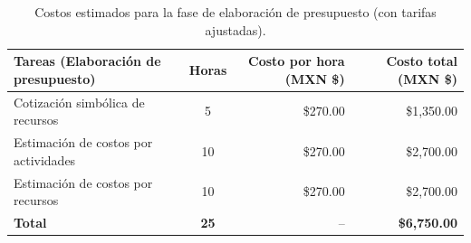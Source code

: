 \begin{table}[H]
	\centering
	\renewcommand{\arraystretch}{1.6}
	\setlength{\tabcolsep}{10pt}
	\Huge
	\begin{adjustbox}{max width=\textwidth}
		\begin{tabular}{|p{9.5cm}|c|r|r|}
			\hline
			\textbf{Tareas (Elaboración de presupuesto)} & \textbf{Horas} & \textbf{Costo por hora (MXN \$)} & \textbf{Costo total (MXN \$)} \\ \hline
			Cotización simbólica de recursos & 5 & \$270.00 & \$1,350.00 \\ \hline
			Estimación de costos por actividades & 10 & \$270.00 & \$2,700.00 \\ \hline
			Estimación de costos por recursos & 10 & \$270.00 & \$2,700.00 \\ \hline
			\textbf{Total} & \textbf{25} & -- & \textbf{\$6,750.00} \\ \hline
		\end{tabular}
	\end{adjustbox}
	\caption{Costos estimados para la fase de elaboración de presupuesto (con tarifas ajustadas).}
	\label{tab:costos_presupuesto_actualizado}
\end{table}

